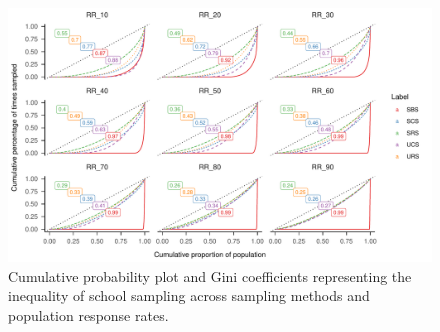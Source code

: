 \documentclass[
  english,
  man,floatsintext]{apa6}
\begin{document}
\begin{figure}
\includegraphics{6---Paper_files/figure-latex/fig-gini-curve-1} \caption{Cumulative probability plot and Gini coefficients representing the inequality of school sampling across sampling methods and population response rates.}\label{fig:fig-gini-curve}
\end{figure}
\end{document}
